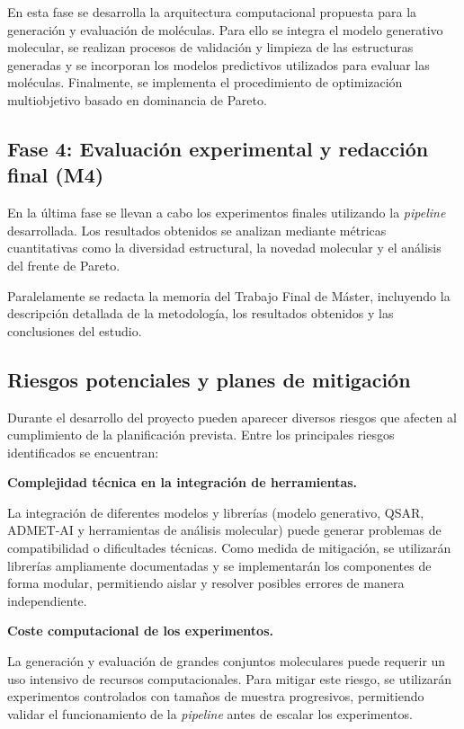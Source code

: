 \documentclass[IB]{TFUOC}%
\begin{document}
En esta fase se desarrolla la arquitectura computacional propuesta para la generación y evaluación de moléculas. Para ello se integra el modelo generativo molecular, se realizan procesos de validación y limpieza de las estructuras generadas y se incorporan los modelos predictivos utilizados para evaluar las moléculas. Finalmente, se implementa el procedimiento de optimización multiobjetivo basado en dominancia de Pareto.

\subsection{Fase 4: Evaluación experimental y redacción final (M4)}

En la última fase se llevan a cabo los experimentos finales utilizando la \textit{pipeline} desarrollada. Los resultados obtenidos se analizan mediante métricas cuantitativas como la diversidad estructural, la novedad molecular y el análisis del frente de Pareto.

Paralelamente se redacta la memoria del Trabajo Final de Máster, incluyendo la descripción detallada de la metodología, los resultados obtenidos y las conclusiones del estudio.

\subsection{Riesgos potenciales y planes de mitigación}

Durante el desarrollo del proyecto pueden aparecer diversos riesgos que afecten al cumplimiento de la planificación prevista. Entre los principales riesgos identificados se encuentran:

\medskip
\textbf{Complejidad técnica en la integración de herramientas.}
\smallskip

La integración de diferentes modelos y librerías (modelo generativo, QSAR, ADMET-AI y herramientas de análisis molecular) puede generar problemas de compatibilidad o dificultades técnicas. Como medida de mitigación, se utilizarán librerías ampliamente documentadas y se implementarán los componentes de forma modular, permitiendo aislar y resolver posibles errores de manera independiente.

\medskip
\textbf{Coste computacional de los experimentos.}
\smallskip

La generación y evaluación de grandes conjuntos moleculares puede requerir un uso intensivo de recursos computacionales. Para mitigar este riesgo, se utilizarán experimentos controlados con tamaños de muestra progresivos, permitiendo validar el funcionamiento de la \textit{pipeline} antes de escalar los experimentos.
\end{document}
